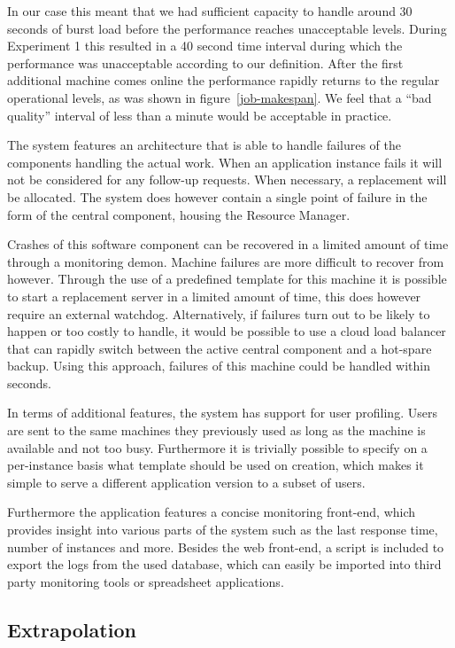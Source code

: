 \documentclass[conference]{IEEEtran}
\begin{document}
In our case this meant that we had sufficient capacity to handle around 30 seconds of burst load before the performance reaches unacceptable levels. During Experiment 1 this resulted in a 40 second time interval during which the performance was unacceptable according to our definition. After the first additional machine comes online the performance rapidly returns to the regular operational levels, as was shown in figure~\ref{job-makespan}. We feel that a ``bad quality'' interval of less than a minute would be acceptable in practice. 

The system features an architecture that is able to handle failures of the components handling the actual work. When an application instance fails it will not be considered for any follow-up requests. When necessary, a replacement will be allocated. The system does however contain a single point of failure in the form of the central component, housing the Resource Manager. 

Crashes of this software component can be recovered in a limited amount of time through a monitoring demon. Machine failures are more difficult to recover from however. Through the use of a predefined template for this machine it is possible to start a replacement server in a limited amount of time, this does however require an external watchdog. Alternatively, if failures turn out to be likely to happen or too costly to handle, it would be possible to use a cloud load balancer that can rapidly switch between the active central component and a hot-spare backup. Using this approach, failures of this machine could be handled within seconds.

In terms of additional features, the system has support for user profiling. Users are sent to the same machines they previously used as long as the machine is available and not too busy. Furthermore it is trivially possible to specify on a per-instance basis what template should be used on creation, which makes it simple to serve a different application version to a subset of users. 

Furthermore the application features a concise monitoring front-end, which provides insight into various parts of the system such as the last response time, number of instances and more. Besides the web front-end, a script is included to export the logs from the used database, which can easily be imported into third party monitoring tools or spreadsheet applications.

\subsection{Extrapolation}
\end{document}
